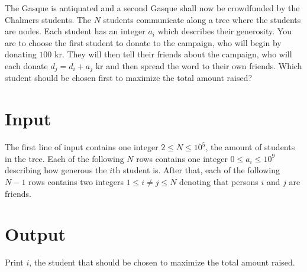 
The Gasque is antiquated and a second Gasque shall now be crowdfunded by the Chalmers students. The $N$ students communicate along a tree where the students are nodes. Each student has an integer $a_i$ which describes their generosity. You are to choose the first student to donate to the campaign, who will begin by donating $100$ kr. They will then tell their friends about the campaign, who will each donate $d_j=d_i+a_j$ kr and then spread the word to their own friends. Which student should be chosen first to maximize the total amount raised?

\section*{Input}

The first line of input contains one integer $2 \leq N \leq 10^5$, the amount of students in the tree. Each of the following $N$ rows contains one integer $0 \leq a_i \leq 10^9$ describing how generous the $i$th student is. After that, each of the following $N-1$ rows contains two integers $1\leq i\neq j \leq N$ denoting that persons $i$ and $j$ are friends.

\section*{Output}

Print $i$, the student that should be chosen to maximize the total amount raised. 
